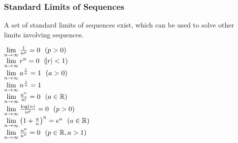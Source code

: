 \documentclass[12pt]{report}
\begin{document}
\begin{flushleft}
\subsubsection*{Standard Limits of Sequences}
A set of standard limits of sequences exist, which can be used to solve other
limits involving sequences.

\begin{formulalist}
    \(\lim\limits_{n\rightarrow\infty}\frac{1}{n^p} = 0 \:\:\:(p > 0)\) \\
    \(\lim\limits_{n\rightarrow\infty} r^n = 0 \:\:\:(\abs{r} < 1)\) \\
    \(\lim\limits_{n\rightarrow\infty} a^{\frac{1}{n}} = 1 \:\:\:(a > 0)\) \\
    \(\lim\limits_{n\rightarrow\infty} n^{\frac{1}{n}} = 1\) \\
    \(\lim\limits_{n\rightarrow\infty} \frac{a^n}{n!} = 0 \:\:\:(a \in \mathbb{R})\) \\
    \(\lim\limits_{n\rightarrow\infty} \frac{\log(n)}{n^p} = 0 \:\:\:(p > 0)\) \\
    \(\lim\limits_{n\rightarrow\infty} \left(1 + \frac{a}{n}\right)^n 
    = e^a \:\:\:(a \in \mathbb{R})\) \\
    \(\lim\limits_{n\rightarrow\infty} \frac{n^p}{a^n} 
    = 0 \:\:\:(p \in \mathbb{R}, a > 1)\) \\  
\end{formulalist}


\end{flushleft}
\end{document}
